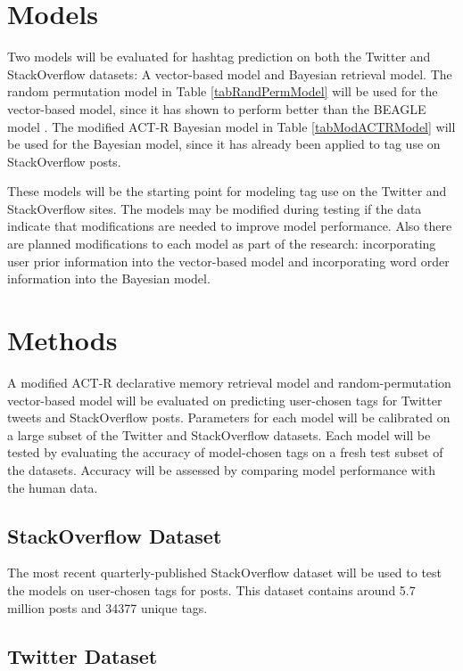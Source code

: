 \documentclass[man,floatsintext,donotrepeattitle]{apa6}
\begin{document}
\section{Models}

Two models will be evaluated for hashtag prediction on both the Twitter and StackOverflow datasets:
A vector-based model and Bayesian retrieval model.
The random permutation model \parencite{Sahlgren2008} in Table \ref{tabRandPermModel} will be used for the vector-based model, since it has shown to perform better than the BEAGLE model \parencite{Recchia2010}.
The modified ACT-R Bayesian model \parencite{Stanley2013} in Table \ref{tabModACTRModel} will be used for the Bayesian model, since it has already been applied to tag use on StackOverflow posts.

These models will be the starting point for modeling tag use on the Twitter and StackOverflow sites.
The models may be modified during testing if the data indicate that modifications are needed to improve model performance.
Also there are planned modifications to each model as part of the research:
incorporating user prior information into the vector-based model and incorporating word order information into the Bayesian model.

\section{Methods}

A modified ACT-R declarative memory retrieval model and random-permutation vector-based model will be evaluated on predicting user-chosen tags for Twitter tweets and StackOverflow posts.
Parameters for each model will be calibrated on a large subset of the Twitter and StackOverflow datasets.
Each model will be tested by evaluating the accuracy of model-chosen tags on a fresh test subset of the datasets.
Accuracy will be assessed by comparing model performance with the human data.

\subsection{StackOverflow Dataset}

The most recent quarterly-published StackOverflow dataset \parencite{DataDump2013} will be used to test the models on user-chosen tags for posts.
This dataset contains around \num{5.7} million posts and \num{34377} unique tags.

\subsection{Twitter Dataset}
\end{document}
